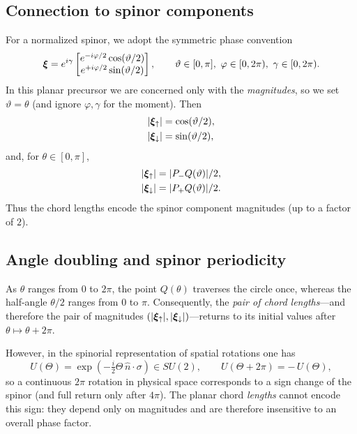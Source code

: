 \subsection{Connection to spinor components}
\label{sec:planar_spinor}

For a normalized spinor, we adopt the symmetric phase convention
\begin{equation}
\label{eq:spinor_symmetric}
\bm{\xi}
= e^{i\gamma}
\begin{bmatrix}
e^{-i\varphi/2}\cos(\vartheta/2)\\
e^{+i\varphi/2}\sin(\vartheta/2)
\end{bmatrix},
\qquad
\vartheta\in[0,\pi],\ \varphi\in[0,2\pi),\ \gamma\in[0,2\pi).
\end{equation}
In this planar precursor we are concerned only with the \emph{magnitudes}, so we set $\vartheta=\theta$ (and ignore $\varphi,\gamma$ for the moment). Then
\begin{align}
    |\bm{\xi}_\uparrow| &= \cos(\vartheta/2), \\
    |\bm{\xi}_\downarrow| &= \sin(\vartheta/2),
\end{align}
and, for $\theta\in[0,\pi]$,
\begin{align}
    |\bm{\xi}_\uparrow| &= |P_-Q(\vartheta)|/2, \\
    |\bm{\xi}_\downarrow| &= |P_+Q(\vartheta)|/2.
\end{align}
Thus the chord lengths encode the spinor component magnitudes (up to a factor of $2$).

\subsection{Angle doubling and spinor periodicity}
\label{sec:planar_periodicity}

As $\theta$ ranges from $0$ to $2\pi$, the point $Q(\theta)$ traverses the circle once, whereas the half-angle $\theta/2$ ranges from $0$ to $\pi$. Consequently, the \emph{pair of chord lengths}---and therefore the pair of magnitudes $(|\bm{\xi}_\uparrow|,|\bm{\xi}_\downarrow|)$---returns to its initial values after $\theta\mapsto\theta+2\pi$.

However, in the spinorial representation of spatial rotations one has
\[
U(\Theta)=\exp\!\left(-\tfrac{i}{2}\Theta\,\hat{n}\cdot\sigma\right)\in SU(2),
\qquad
U(\Theta+2\pi)=-\,U(\Theta),
\]
so a continuous $2\pi$ rotation in physical space corresponds to a sign change of the spinor (and full return only after $4\pi$). The planar chord \emph{lengths} cannot encode this sign: they depend only on magnitudes and are therefore insensitive to an overall phase factor.

